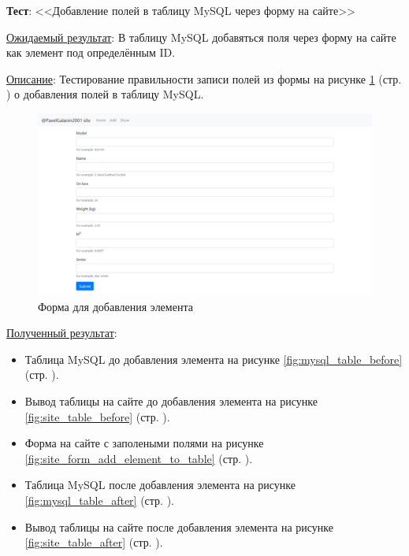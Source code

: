 \textbf{Тест}: <<Добавление полей в таблицу MySQL через форму на сайте>>

\underline{Ожидаемый результат}:
В таблицу MySQL добавяться поля через форму на сайте как элемент под определённым ID.

\underline{Описание}:
Тестирование правильности записи полей из формы
на рисунке \ref{fig:site_form}
(стр. \pageref{fig:site_form})
о добавления полей в таблицу MySQL.

\begin{figure}[!htp]
    \begin{center}
        \includegraphics[width=12cm]{../_input/tests/site_form.png}
    \end{center}
    \caption{Форма для добавления элемента\label{fig:site_form}}
\end{figure}

\underline{Полученный результат}:

\begin{itemize}
    \item Таблица MySQL до добавления элемента
    на рисунке \ref{fig:mysql_table_before}
    (стр. \pageref{fig:mysql_table_before}).

    \item Вывод таблицы на сайте до добавления элемента
    на рисунке \ref{fig:site_table_before}
    (стр. \pageref{fig:site_table_before}).

    \item Форма на сайте с заполеными полями
    на рисунке \ref{fig:site_form_add_element_to_table}
    (стр. \pageref{fig:site_form_add_element_to_table}).

    \item Таблица MySQL после добавления элемента
    на рисунке \ref{fig:mysql_table_after}
    (стр. \pageref{fig:mysql_table_after}).

    \item Вывод таблицы на сайте после добавления элемента
    на рисунке \ref{fig:site_table_after}
    (стр. \pageref{fig:site_table_after}).
\end{itemize}

